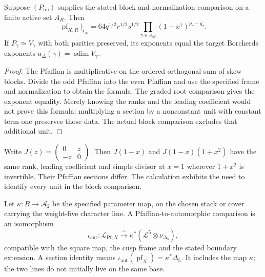\begin{proposition}
\label{prop:pfaffian-product-finite-stage}
Suppose \((P_{\mathrm{fin}})\) supplies the stated block and
normalization comparison on a finite active set \(A_R\).  Then
\[
 \operatorname{pf}_{X,R}|_{\mathfrak c_\infty}
 =64q^{1/2}r^{1/2}s^{1/2}
 \prod_{\gamma\in A_R}(1-x^\gamma)^{p_\gamma-q_\gamma}.
\]
If \(P_\gamma\simeq V_\gamma\) with both parities preserved,
its exponents equal the target Borcherds exponents
\(a_\Delta(\gamma)=\operatorname{sdim}V_\gamma\).
\end{proposition}
\begin{proof}
The Pfaffian is multiplicative on the ordered orthogonal sum of
skew blocks.  Divide the odd Pfaffian into the even Pfaffian and
use the specified frame and normalization to obtain the formula.
The graded root comparison gives the exponent equality.  Merely
knowing the ranks and the leading coefficient would not prove this
formula: multiplying a section by a nonconstant unit with constant
term one preserves those data.  The actual block comparison excludes
that additional unit.
\end{proof}

Write \(J(z)=\left(\begin{smallmatrix}0&z\\-z&0\end{smallmatrix}\right)\).
Then \(J(1-x)\) and \(J(1-x)(1+x^2)\) have the same rank,
leading coefficient and simple divisor at \(x=1\) wherever
\(1+x^2\) is invertible.  Their Pfaffian sections differ.  The
calculation exhibits the need to identify every unit in the block
comparison.

\begin{definition}
\label{def:pfaffian-to-automorphic-line-comparison}
Let \(\kappa:B\to\mathcal A_2\) be the specified parameter map,
on the chosen stack or cover carrying the weight-five character
line.  A Pfaffian-to-automorphic comparison is an isomorphism
\[
 \iota_{\mathrm{aut}}:\mathscr L_{\mathrm{Pf},X}
 \xrightarrow{\sim}
 \kappa^*(\mathcal L^5\otimes\nu_{\Delta_5}),
\]
compatible with the square map, the cusp frame and the stated
boundary extension.  A section identity means
\(\iota_{\mathrm{aut}}(\operatorname{pf}_X)=\kappa^*\Delta_5\).
It includes the map \(\kappa\); the two lines do not initially live
on the same base.
\end{definition}

